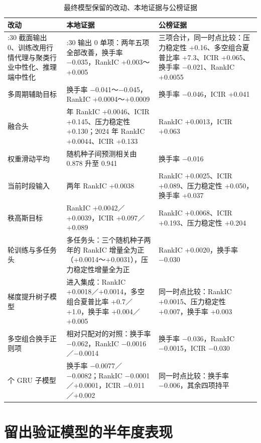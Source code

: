 \documentclass[UTF8,a4paper,zihao=-4,fontset=none]{ctexart}
\newcommand{\tabsetup}{\small\linespread{1.15}\selectfont\renewcommand{\arraystretch}{1.25}}
\begin{document}
\begin{table}[htbp]
\caption{最终模型保留的改动、本地证据与公榜证据}\label{tab:increments}
\centering\tabsetup
\begin{tabularx}{\textwidth}{@{}>{\raggedright\arraybackslash\hsize=0.7\hsize}X>{\raggedright\arraybackslash\hsize=1.2\hsize}X>{\raggedright\arraybackslash\hsize=1.1\hsize}X@{}}
\toprule
改动 & 本地证据 & 公榜证据\\
\midrule
09:30 截面输出 0、训练改用行情代理与聚类行业中性化、推理端中性化 & 09:30 输出 0 单项：两年五项全部改善，换手率 −0.035，RankIC +0.003～+0.005 & 三项合计，同一时点比较：压力稳定性 +0.16、多空组合夏普比率 +7.3、ICIR +0.065、换手率 −0.021、RankIC +0.0055\\
多周期辅助目标 & 换手率 −0.041～−0.045，RankIC +0.0004～+0.0009 & 换手率 −0.046，ICIR +0.041\\
融合头 & 2023 年 RankIC +0.0046、ICIR +0.145、压力稳定性 +0.130；2024 年 RankIC +0.0044、ICIR +0.133 & RankIC +0.0013，ICIR +0.063\\
权重滑动平均 & 随机种子间预测相关由 0.878 升至 0.941 & 换手率 −0.016\\
当前时段输入 & 两年 RankIC +0.0038 & RankIC +0.0025、ICIR +0.089、压力稳定性 +0.050，换手率 +0.037\\
秩高斯目标 & RankIC +0.0042／+0.0039，ICIR +0.097／+0.089 & RankIC +0.0068、ICIR +0.193、压力稳定性 +0.204\\
6 轮训练与多任务头 & 多任务头：三个随机种子两年的 RankIC 增量全为正（+0.0014～+0.0031），压力稳定性增量全为正 & RankIC +0.0020，换手率 −0.030\\
梯度提升树子模型 & 进入集成：RankIC +0.0018／+0.0014，多空组合夏普比率 +0.7／+1.0，换手率 +0.004／+0.005 & 同一时点比较：RankIC +0.0015、压力稳定性 +0.007，换手率 +0.003\\
多空组合换手正则项 & 相对只配对的对照：换手率 −0.062，RankIC −0.0016／−0.0014 & 换手率 −0.036，RankIC −0.0015，ICIR −0.030\\
2 个 GRU 子模型 & 换手率 −0.0077／−0.0082；RankIC −0.0001／+0.0001，ICIR −0.011／+0.002 & 同一时点比较：换手率 −0.006，其余四项持平\\
\bottomrule
\end{tabularx}
\end{table}

\section{留出验证模型的半年度表现}\label{app:half}
\end{document}
